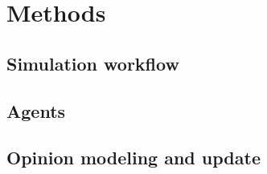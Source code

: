 \section{Methods}
\label{sec:methods}

\subsection{Simulation workflow}
\subsection{Agents}
\subsection{Opinion modeling and update}